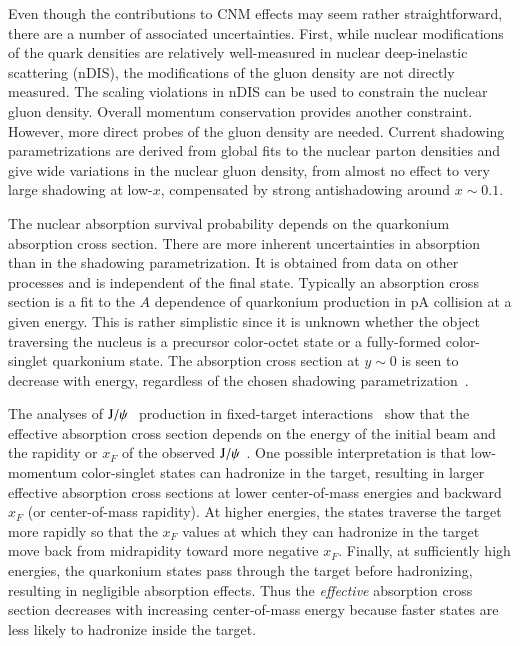 Even though the contributions to CNM effects may 
seem rather straightforward, there are a number of associated uncertainties. 
First, while nuclear modifications of the quark densities are relatively 
well-measured in nuclear deep-inelastic scattering (nDIS), the modifications of the 
gluon density are not directly measured.  The scaling violations in nDIS can 
be used to constrain the nuclear gluon density. Overall momentum conservation 
provides another constraint. However, more direct probes of the gluon 
density are needed. Current shadowing parametrizations are derived from 
global fits to the nuclear parton densities and
give wide variations in the nuclear gluon 
density, from almost no effect to very large shadowing at low-$x$, 
compensated by strong antishadowing around $x \sim 0.1$.  


The nuclear absorption survival probability depends on the quarkonium 
absorption cross section. There are more inherent uncertainties 
in absorption than in the shadowing parametrization. It is obtained 
from data on other processes and is independent of the final 
state. Typically an absorption cross section is a fit to the $A$ dependence 
of quarkonium production in pA collision at a given energy. 
This is rather simplistic since it is unknown whether the object traversing the nucleus is a precursor 
color-octet state or a fully-formed color-singlet quarkonium state. The \jpsi absorption cross 
section at $y \sim 0$ is seen to decrease with energy, regardless of the chosen shadowing 
parametrization~\cite{Lourenco:2008sk}. 

The analyses of $\mathrm{J}/\psi\hspace {0.05in}$ production in fixed-target interactions~\cite{Lourenco:2008sk} 
show that the effective absorption
cross section depends on the energy of the initial beam and the rapidity or
$x_F$ of the observed $\mathrm{J}/\psi\hspace {0.05in}$.  One possible interpretation is that 
low-momentum color-singlet states can hadronize in the
target, resulting in larger effective absorption cross sections at lower
center-of-mass energies and backward $x_F$ (or center-of-mass rapidity).
At higher energies, the states traverse the target more rapidly so that
the $x_F$ values at which they can hadronize in the target move 
back from midrapidity toward more negative $x_F$.
Finally, at sufficiently high energies, the quarkonium states pass 
through the target before hadronizing, resulting in negligible absorption
effects.  Thus the {\it effective} absorption cross section decreases with 
increasing center-of-mass energy because faster states are less likely 
to hadronize inside the target.

